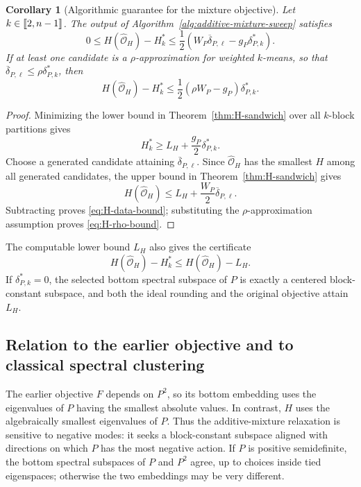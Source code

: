 \documentclass[11pt]{article}
\newtheorem{corollary}[theorem]{Corollary}
\newcommand{\1}{\mathbf{1}}
\providecommand{\llbracket}{\mathopen{[\mkern-2.7mu[}}
\providecommand{\rrbracket}{\mathclose{]\mkern-2.7mu]}}
\begin{document}
\begin{corollary}[Algorithmic guarantee for the mixture objective]
\label{cor:H-algorithm}
Let $k\in\llbracket 2,n-1\rrbracket$.
The output of Algorithm~\ref{alg:additive-mixture-sweep} satisfies
\begin{equation}
    0\leq H(\widehat{\mathcal O}_H)-H_k^*
    \leq\frac12\left(
       W_P\overline\delta_{P,\ell}
       -g_P\delta_{P,k}^*
      \right).
    \label{eq:H-data-bound}
\end{equation}
If at least one candidate is a $\rho$-approximation for weighted
$k$-means, so that
$\overline\delta_{P,\ell}\leq\rho\delta_{P,k}^*$, then
\begin{equation}
    H(\widehat{\mathcal O}_H)-H_k^*
    \leq\frac12(\rho W_P-g_P)\delta_{P,k}^*.
    \label{eq:H-rho-bound}
\end{equation}
\end{corollary}

\begin{proof}
Minimizing the lower bound in Theorem~\ref{thm:H-sandwich} over all
$k$-block partitions gives
\[
    H_k^*\geq L_H+\frac{g_P}{2}\delta_{P,k}^*.
\]
Choose a generated candidate attaining
$\overline\delta_{P,\ell}$.  Since
$\widehat{\mathcal O}_H$ has the smallest $H$ among all generated
candidates, the upper bound in Theorem~\ref{thm:H-sandwich} gives
\[
    H(\widehat{\mathcal O}_H)
    \leq L_H+\frac{W_P}{2}\overline\delta_{P,\ell}.
\]
Subtracting proves \eqref{eq:H-data-bound}; substituting the
$\rho$-approximation assumption proves \eqref{eq:H-rho-bound}.
\end{proof}

The computable lower bound $L_H$ also gives the certificate
\[
    H(\widehat{\mathcal O}_H)-H_k^*
    \leq H(\widehat{\mathcal O}_H)-L_H.
\]
If $\delta_{P,k}^*=0$, the selected bottom spectral subspace of $P$ is
exactly a centered block-constant subspace, and both the ideal
rounding and the original objective attain $L_H$.

\subsection{Relation to the earlier objective and to classical
spectral clustering}

The earlier objective $F$ depends on $P^2$, so its bottom embedding
uses the eigenvalues of $P$ having the smallest absolute values.  In
contrast, $H$ uses the algebraically smallest eigenvalues of $P$.
Thus the additive-mixture relaxation is sensitive to negative modes:
it seeks a block-constant subspace aligned with directions on which
$P$ has the most negative action.  If $P$ is positive semidefinite,
the bottom spectral subspaces of $P$ and $P^2$ agree, up to choices inside
tied eigenspaces; otherwise the two embeddings may be very different.
\end{document}
